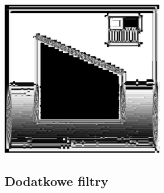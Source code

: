 \documentclass[a4paper,12pt,openany]{report}
\begin{document}
\begin{center}
\includegraphics[width=7cm]{resources/modified/sample/sample_sharpen_21x21.jpg}
\end{center}

\pagebreak
\subsection{Dodatkowe filtry}
\end{document}
